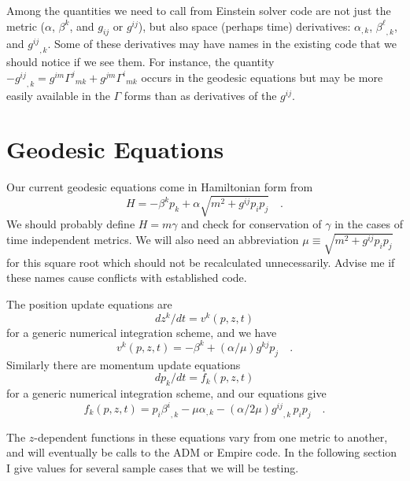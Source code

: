     Among the quantities we need to call from Einstein solver code
are not just the metric ($\alpha$, $\beta^k$, and $g_{ij}$ or
$g^{ij}$), but also space (perhaps time) derivatives: $\alpha_{,k}$,
${\beta^\ell}_{,k}$, and ${g^{ij}}_{,k}$.
    Some of these derivatives may have names in the existing code that
we should notice if we see them.
    For instance, the quantity $-{g^{ij}}_{,k} = g^{im}
{\Gamma^j}_{mk} + g^{jm} {\Gamma^i}_{mk}$ occurs in the geodesic
equations but may be more easily available in the $\Gamma$ forms than
as derivatives of the $g^{ij}$.


\section{Geodesic Equations}
    Our current geodesic equations come in Hamiltonian form from
    \begin{equation}\label{eq-H}
    H = - \beta^k p_k + \alpha \sqrt{m^2 + g^{ij} p_i p_j}
    \quad .
    \end{equation}
    We should probably define $H = m\gamma$ and check for
conservation of $\gamma$ in the cases of time independent metrics.
    We will also need an abbreviation $\mu \equiv \sqrt{m^2 + g^{ij}
p_i p_j}$ for this square root which should not be recalculated
unnecessarily.  
    Advise me if these names cause conflicts with established code.

    The position update equations are
    \begin{equation}\label{eq-v}
    dz^k/dt = v^k(p,z,t)
    \end{equation}
    for a generic numerical integration scheme, and we have
    \begin{equation}\label{eq-gv}
    v^k(p,z,t) = -\beta^k + (\alpha/\mu) g^{kj} p_j
    \quad .
    \end{equation}
    Similarly there are momentum update equations
    \begin{equation}\label{eq-p}
    dp_k/dt = f_k(p,z,t)
    \end{equation}
    for a generic numerical integration scheme, and our equations
give
    \begin{equation}\label{eq-gp}
    f_k(p,z,t) = p_i{\beta^i}_{,k} - \mu \alpha_{,k}
    - (\alpha/2\mu) {g^{ij}}_{,k}\, p_i p_j
    \quad .
    \end{equation}

    The $z$-dependent functions in these equations vary from one
metric to another, and will eventually be calls to the ADM or Empire
code.  In the following section I give values for several sample
cases that we will be testing.

